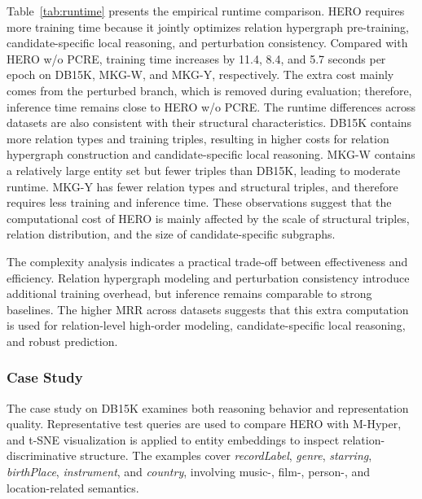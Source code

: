 \documentclass[a4paper,fleqn]{cas-sc}
\begin{document}
Table~\ref{tab:runtime} presents the empirical runtime comparison. HERO requires more training time because it jointly optimizes relation hypergraph pre-training, candidate-specific local reasoning, and perturbation consistency. Compared with HERO w/o PCRE, training time increases by 11.4, 8.4, and 5.7 seconds per epoch on DB15K, MKG-W, and MKG-Y, respectively. The extra cost mainly comes from the perturbed branch, which is removed during evaluation; therefore, inference time remains close to HERO w/o PCRE.
The runtime differences across datasets are also consistent with their structural characteristics. DB15K contains more relation types and training triples, resulting in higher costs for relation hypergraph construction and candidate-specific local reasoning. MKG-W contains a relatively large entity set but fewer triples than DB15K, leading to moderate runtime. MKG-Y has fewer relation types and structural triples, and therefore requires less training and inference time. These observations suggest that the computational cost of HERO is mainly affected by the scale of structural triples, relation distribution, and the size of candidate-specific subgraphs.

The complexity analysis indicates a practical trade-off between effectiveness and efficiency. Relation hypergraph modeling and perturbation consistency introduce additional training overhead, but inference remains comparable to strong baselines. The higher MRR across datasets suggests that this extra computation is used for relation-level high-order modeling, candidate-specific local reasoning, and robust prediction.


\subsubsection{Case Study}

The case study on DB15K examines both reasoning behavior and representation quality. Representative test queries are used to compare HERO with M-Hyper, and t-SNE visualization is applied to entity embeddings to inspect relation-discriminative structure. The examples cover \textit{recordLabel}, \textit{genre}, \textit{starring}, \textit{birthPlace}, \textit{instrument}, and \textit{country}, involving music-, film-, person-, and location-related semantics.
\end{document}
